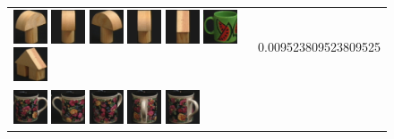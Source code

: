 \begin{figure}[!bp]
\begin{tabular}{m{11cm} | m{3cm} |}
\includegraphics[width=1cm]{coil/beeld-3.eps}
\includegraphics[width=1cm]{coil/beeld-5.eps}
\includegraphics[width=1cm]{coil/beeld-4.eps}
\includegraphics[width=1cm]{coil/beeld-2.eps}
\includegraphics[width=1cm]{coil/beeld-47.eps}
\includegraphics[width=1cm]{coil/beeld-31.eps}
\includegraphics[width=1cm]{coil/beeld-46.eps}
& {\scriptsize 0.009523809523809525}
\\
\includegraphics[width=1cm]{coil/beeld-60.eps}
\includegraphics[width=1cm]{coil/beeld-61.eps}
\includegraphics[width=1cm]{coil/beeld-63.eps}
\includegraphics[width=1cm]{coil/beeld-65.eps}
\includegraphics[width=1cm]{coil/beeld-64.eps}

\end{tabular}
\end{figure}
